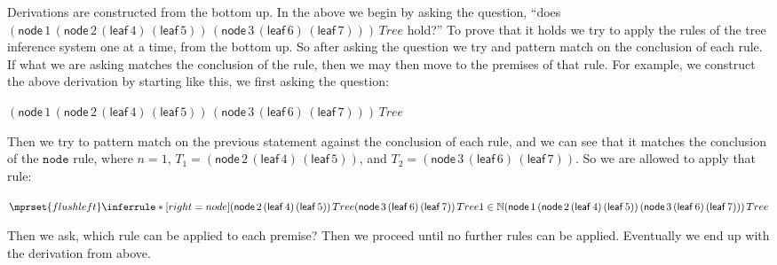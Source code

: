 \documentclass{article}
\begin{document}
  Derivations are constructed from the bottom up.  In the above we
  begin by asking the question, ``does
  $(\mathsf{node}\,1\,(\mathsf{node}\,2\, (\mathsf{leaf}\, 4)\,
  (\mathsf{leaf}\, 5))\, (\mathsf{node}\, 3\, (\mathsf{leaf}\,
  6)\,(\mathsf{leaf}\, 7)))\,Tree$ hold?''  To prove that it holds we
  try to apply the rules of the tree inference system one at a time,
  from the bottom up.  So after asking the question we try and pattern
  match on the conclusion of each rule.  If what we are asking matches
  the conclusion of the rule, then we may then move to the premises of
  that rule.  For example, we construct the above derivation by
  starting like this, we first asking the question:
  \begin{center}
    \begin{math}
      (\mathsf{node}\,1\,(\mathsf{node}\,2\, (\mathsf{leaf}\, 4)\, (\mathsf{leaf}\, 5))\, (\mathsf{node}\, 3\, (\mathsf{leaf}\, 6)\,(\mathsf{leaf}\, 7)))\,Tree
    \end{math}
  \end{center}
  Then we try to pattern match on the previous statement against the
  conclusion of each rule, and we can see that it matches the
  conclusion of the $\mathtt{node}$ rule, where $n = 1$, $T_1 =
  (\mathsf{node}\,2\, (\mathsf{leaf}\, 4)\, (\mathsf{leaf}\, 5))$, and
  $T_2 = (\mathsf{node}\, 3\, (\mathsf{leaf}\, 6)\,(\mathsf{leaf}\,
  7))$.  So we are allowed to apply that rule:
    \begin{center}
    \scriptsize
    \begin{math}
      $$\mprset{flushleft}
      \inferrule* [right=\scriptsize node] {
        (\mathsf{node}\,2\, (\mathsf{leaf}\, 4)\,(\mathsf{leaf}\, 5))\,Tree
        \\
        (\mathsf{node}\, 3\, (\mathsf{leaf}\, 6)\,(\mathsf{leaf}\, 7))\,Tree
        \\
        1 \in \mathbb{N}
      }{(\mathsf{node}\,1\,(\mathsf{node}\,2\, (\mathsf{leaf}\, 4)\, (\mathsf{leaf}\, 5))\, (\mathsf{node}\, 3\, (\mathsf{leaf}\, 6)\,(\mathsf{leaf}\, 7)))\,Tree}
    \end{math}
  \end{center}
  Then we ask, which rule can be applied to each premise?  Then we
  proceed until no further rules can be applied.  Eventually we end up
  with the derivation from above.
\end{document}

